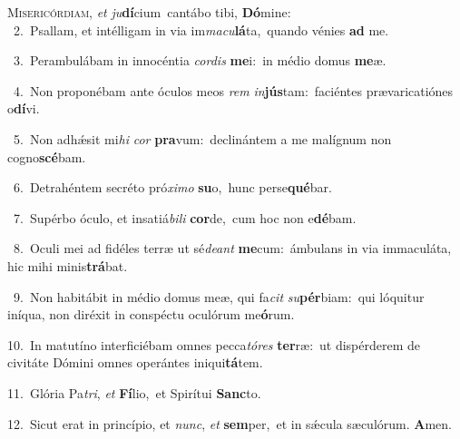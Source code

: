 \lettrine{\initial\textcolor{\initialcolor}{M}}{isericórdiam,} \textit{et} \textit{ju}\-\textbf{dí}cium~\star cantábo tibi, \textbf{Dó}\-mine:\\
{\numbfont\textcolor{\numbcolor}{~2.}}~Psallam, et intélligam in via im\-\textit{ma}\-\textit{cu}\textbf{lá}ta,~\star quando vénies \textbf{ad} me.\par
{\numbfont\textcolor{\numbcolor}{~3.}}~Perambulábam in innocéntia \textit{cor}\-\textit{dis} \textbf{me}\-i:~\star in médio domus \textbf{me}\-æ.\par
{\numbfont\textcolor{\numbcolor}{~4.}}~Non proponébam ante óculos meos \textit{rem} \textit{in}\-\textbf{jús}tam:~\star faciéntes prævaricatiónes o\-\textbf{dí}\-vi.\par
{\numbfont\textcolor{\numbcolor}{~5.}}~Non adhǽsit mi\textit{hi} \textit{cor} \textbf{pra}\-vum:~\star declinántem a me malígnum non cogno\-\textbf{scé}\-bam.\par
{\numbfont\textcolor{\numbcolor}{~6.}}~Detrahéntem secréto pró\-\textit{xi}\-\textit{mo} \textbf{su}\-o,~\star hunc perse\-\textbf{qué}\-bar.\par
{\numbfont\textcolor{\numbcolor}{~7.}}~Supérbo óculo, et insatiá\-\textit{bi}\-\textit{li} \textbf{cor}\-de,~\star cum hoc non e\-\textbf{dé}\-bam.\par
{\numbfont\textcolor{\numbcolor}{~8.}}~Oculi mei ad fidéles terræ ut sé\-\textit{de}\-\textit{ant} \textbf{me}\-cum:~\star ámbulans in via immaculáta, hic mihi minis\-\textbf{trá}\-bat.\par
{\numbfont\textcolor{\numbcolor}{~9.}}~Non habitábit in médio domus meæ, qui fa\textit{cit} \textit{su}\-\textbf{pér}biam:~\star qui lóquitur iníqua, non diréxit in conspéctu oculórum me\-\textbf{ó}\-rum.\par
{\numbfont\textcolor{\numbcolor}{10.}}~In matutíno interficiébam omnes pecca\-\textit{tó}\-\textit{res} \textbf{ter}\-ræ:~\star ut dispérderem de civitáte Dómini omnes operántes iniqui\-\textbf{tá}\-tem.\par
{\numbfont\textcolor{\numbcolor}{11.}}~Glória Pa\-\textit{tri}\-, \textit{et} \textbf{Fí}\-lio,~\star et Spirítui \textbf{Sanc}\-to.\par
{\numbfont\textcolor{\numbcolor}{12.}}~Sicut erat in princípio, et \textit{nunc}\-, \textit{et} \textbf{sem}\-per,~\star et in sǽcula sæculórum. \textbf{A}\-men.\par
